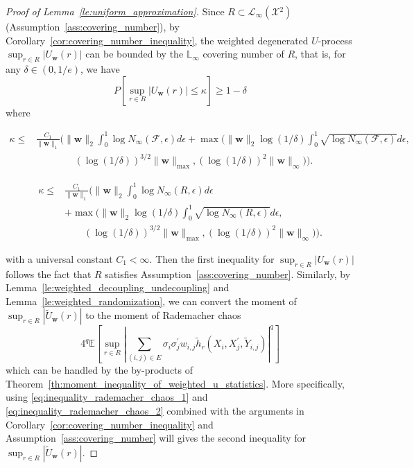 \documentclass[letterpaper]{article} %
\def\DoubleColumn{}
\def\DoubleColumnEnd{}
\def\SingleColumn{}
\def\SingleColumnEnd{}
\newcommand{\E}{\mathbb{E}}
\newcommand{\Pro}{P}
\newcommand{\weight}{\mathbf{w}}
\newcommand{\xspace}{\mathcal{X}}
\newcommand{\pair}[1]{(#1)}
\newcommand{\lnorm}{\mathbb{L}}
\newcommand{\lnormspace}{\mathscr{L}}
\newcommand{\normo}[1]{\|#1\|_1}
\begin{document}
\begin{proof}[Proof of Lemma~\ref{le:uniform_approximation}] %
Since $R\subset\lnormspace{}_\infty(\xspace{}^2)$ (Assumption~\ref{ass:covering_number}), by Corollary~\ref{cor:covering_number_inequality}, the weighted degenerated $U$-process $\sup_{r\in R}|U_\weight{}(r)|$ can be bounded by the $\lnorm{}_\infty$ covering number of $R$, that is, for any $\delta\in (0,1/e)$, we have
\[\Pro[\sup_{r\in R}|U_\weight{}(r)|\le \kappa]\ge 1-\delta\]
where 
\SingleColumn
\begin{align*}
    \kappa\le&\frac{C_1}{\normo{\weight}}\bigg(\|\weight{}\|_2\int_0^{1}\log N_\infty(\mathcal F, \epsilon)d\epsilon+\max\Big(\|\weight{}\|_2\log(1/\delta)\int_0^{1}\sqrt{\log N_\infty(\mathcal F,\epsilon)}d\epsilon,\\
    &\qquad\qquad(\log(1/\delta))^{3/2}\|\weight{}\|_{\max}, (\log(1/\delta))^2\|\weight{}\|_\infty\Big)\bigg).
\end{align*}
\SingleColumnEnd
\DoubleColumn
\begin{align*}
    \kappa\le&\frac{C_1}{\normo{\weight}}\bigg(\|\weight{}\|_2\int_0^{1}\log N_\infty(R, \epsilon)d\epsilon\\
    &+\max\Big(\|\weight{}\|_2\log(1/\delta)\int_0^{1}\sqrt{\log N_\infty(R,\epsilon)}d\epsilon,\\
    &\qquad(\log(1/\delta))^{3/2}\|\weight{}\|_{\max},(\log(1/\delta))^2\|\weight{}\|_\infty\Big)\bigg).
\end{align*}
\DoubleColumnEnd
with a universal constant $C_1<\infty$. 
Then the first inequality for $\sup_{r\in R}|U_\weight{}(r)|$ follows the fact that $R$ satisfies Assumption~\ref{ass:covering_number}.
Similarly, by Lemma~\ref{le:weighted_decoupling_undecoupling} and Lemma~\ref{le:weighted_randomization}, we can convert the moment of $\sup_{r\in R}|\widetilde{U}_\weight{}(r)|$ to the moment of Rademacher chaos
\[4^q\E[\sup_{r\in R}|\sum_{\pair{i,j}\in E}\sigma_i\sigma_j^\prime w_{i,j}\tilde{h}_r(X_i, X_j^\prime,\tilde{Y}_{i,j})|^q]\] 
which can be handled by the by-products of Theorem~\ref{th:moment_inequality_of_weighted_u_statistics}. More specifically, using \eqref{eq:inequality_rademacher_chaos_1} and \eqref{eq:inequality_rademacher_chaos_2} combined with the arguments in Corollary~\ref{cor:covering_number_inequality} and Assumption~\ref{ass:covering_number} will gives the second inequality for $\sup_{r\in R}|\widetilde{U}_\weight{}(r)|$.
\end{proof}
\end{document}
